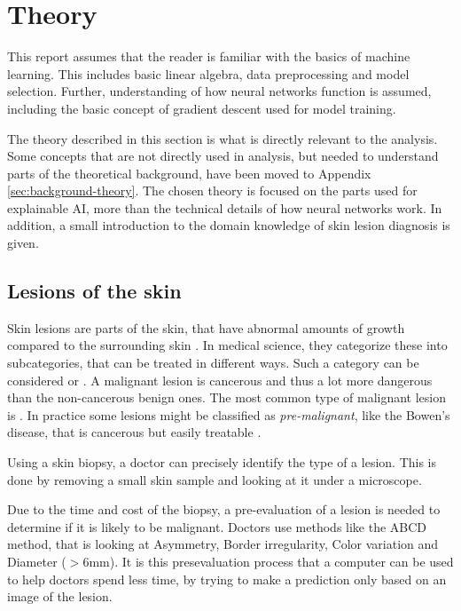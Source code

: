 \chapter{Theory}
This report assumes that the reader is familiar with the basics of machine learning.
This includes basic linear algebra, data preprocessing and model selection.
Further, understanding of how neural networks function is assumed,
including the basic concept of gradient descent used for model training.

The theory described in this section is what is directly relevant to the analysis.
Some concepts that are not directly used in analysis,
but needed to understand parts of the theoretical background,
have been moved to Appendix \ref{sec:background-theory}.
The chosen theory is focused on the parts used for explainable AI, more than the technical details of how neural networks work.
In addition, a small introduction to the domain knowledge of skin lesion diagnosis is given.

\section{Lesions of the skin}
Skin lesions are parts of the skin,
that have abnormal amounts of growth compared to the surrounding skin \cite{dermatologi-laerebogen}.
In medical science, they categorize these into subcategories,
that can be treated in different ways.
Such a category can be considered  or .
A malignant lesion is cancerous and thus a lot more dangerous than the non-cancerous benign ones. 
The most common type of malignant lesion is . 
In practice some lesions might be classified as \textit{pre-malignant},
like the Bowen's disease,
that is cancerous but easily treatable \cite{nhs-bowens-disease}.

Using a skin biopsy,
a doctor can precisely identify the type of a lesion.
This is done by removing a small skin sample and looking at it under a microscope.

Due to the time and cost of the biopsy,
a pre-evaluation of a lesion is needed to determine if it is likely to be malignant.
Doctors use methods like the ABCD method,
that is looking at Asymmetry, Border irregularity, Color variation and Diameter ($>6\text{mm}$)\cite{dermatologi-laerebogen}.
It is this presevaluation process that a computer can be used to help doctors spend less time,
by trying to make a prediction only based on an image of the lesion.

